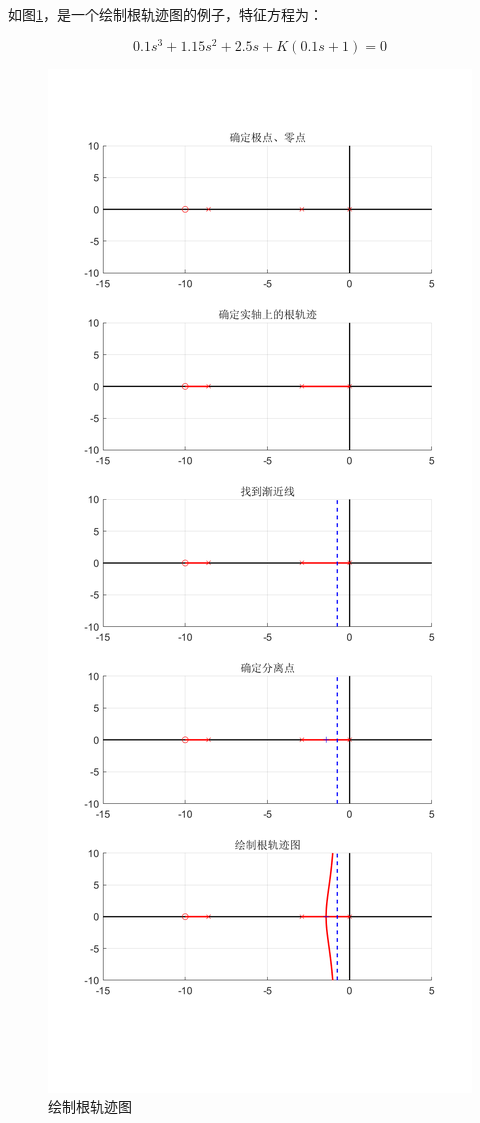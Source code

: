 如图\ref{21}，是一个绘制根轨迹图的例子，特征方程为：

\begin{equation*}
    0.1s^3+1.15s^2+2.5s+K(0.1s+1)=0
\end{equation*}

\begin{figure}[!ht]
    \centering
    \includegraphics[width=0.5\linewidth]{figures/21.png}
    \caption{绘制根轨迹图}
    \label{21}
\end{figure}